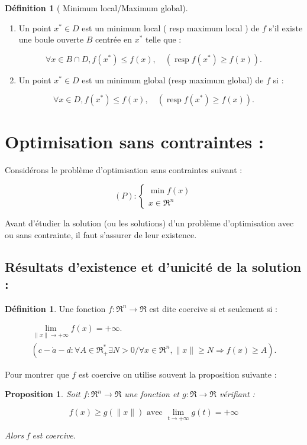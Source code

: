 \documentclass[a4paper,12pt,openany]{book}
\theoremstyle{plain}
\newtheorem{proposition}[theorem]{Proposition}
\theoremstyle{definition}
\newtheorem{definition}[theorem]{Définition}
\theoremstyle{remark}
\theoremstyle{nbstyle}
\begin{document}
	\begin{definition}[ Minimum local/Maximum global]
		\begin{enumerate}
			\item Un point $x^{*} \in D$ est un minimum local ( resp maximum local ) de $f$ s'il existe une boule ouverte $B$ centrée en $x^{*}$ telle que :
		\end{enumerate}
		
		$$
		\forall x \in B \cap D, f\left(x^{*}\right) \leq f(x), \quad\left(\operatorname{resp} f\left(x^{*}\right) \geq f(x)\right) .
		$$
		
		\begin{enumerate}
			\setcounter{enumi}{1}
			\item Un point $x^{*} \in D$ est un minimum global (resp maximum global) de $f$ si :
		\end{enumerate}
		
		$$
		\forall x \in D, f\left(x^{*}\right) \leq f(x), \quad\left(\operatorname{resp} f\left(x^{*}\right) \geq f(x)\right) .
		$$
	\end{definition}
	
	
	\section{Optimisation sans contraintes :}
	Considérons le problème d'optimisation sans contraintes suivant :
	
	$$
	(P):\left\{\begin{array}{c}
	\displaystyle\min f(x) \\
	x \in \Re^{n}
	\end{array}\right.
	$$
	
	
	Avant d'étudier la solution (ou les solutions) d'un problème d'optimisation avec ou sans contrainte, il faut s'assurer de leur existence.
	\subsection{Résultats d'existence et d'unicité de la solution :}
	\begin{definition} Une fonction $f: \Re^{n} \longrightarrow \Re$ est dite coercive si et seulement si :
		
		$$
		\begin{gathered}
		\lim _{\|x\| \longrightarrow+\infty} f(x)=+\infty . \\
		\left(c-\grave{a}-d: \forall A \in \Re_{+}^{*} \exists N>0 / \forall x \in \Re^{n},\|x\| \geq N \Longrightarrow f(x) \geq A\right) .
		\end{gathered}
		$$
	\end{definition}
	Pour montrer que $f$ est coercive on utilise souvent la proposition suivante :\\
	\begin{proposition} Soit $f: \Re^{n} \longrightarrow \Re$ une fonction et $g: \Re \longrightarrow \Re$ vérifiant :
		
		$$
		f(x) \geq g(\|x\|) \text { avec } \lim _{t \longrightarrow+\infty} g(t)=+\infty
		$$
		
		Alors f est coercive.\\
	\end{proposition}
	
\end{document}
